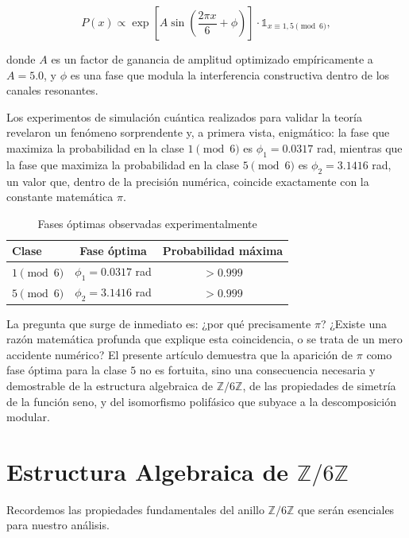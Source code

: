 \documentclass[12pt,a4paper]{article}
\theoremstyle{plain}
\theoremstyle{definition}
\theoremstyle{remark}
\begin{document}
\begin{equation}
P(x) \propto \exp\left[A \sin\left(\frac{2\pi x}{6} + \phi\right)\right] \cdot \mathbb{1}_{x\equiv 1,5 \pmod{6}},
\label{eq:amplitud}
\end{equation}

donde $A$ es un factor de ganancia de amplitud optimizado empíricamente a $A = 5.0$, y $\phi$ es una fase que modula la interferencia constructiva dentro de los canales resonantes.

Los experimentos de simulación cuántica realizados para validar la teoría revelaron un fenómeno sorprendente y, a primera vista, enigmático: la fase que maximiza la probabilidad en la clase $1 \pmod 6$ es $\phi_1 = 0.0317$ rad, mientras que la fase que maximiza la probabilidad en la clase $5 \pmod 6$ es $\phi_2 = 3.1416$ rad, un valor que, dentro de la precisión numérica, coincide exactamente con la constante matemática $\pi$.

\begin{table}[h]
\centering
\caption{Fases óptimas observadas experimentalmente}
\label{tab:fases}
\begin{tabular}{lcc}
\toprule
\textbf{Clase} & \textbf{Fase óptima} & \textbf{Probabilidad máxima} \\
\midrule
$1 \pmod 6$ & $\phi_1 = 0.0317$ rad & $> 0.999$ \\
$5 \pmod 6$ & $\phi_2 = 3.1416$ rad & $> 0.999$ \\
\bottomrule
\end{tabular}
\end{table}

La pregunta que surge de inmediato es: ¿por qué precisamente $\pi$? ¿Existe una razón matemática profunda que explique esta coincidencia, o se trata de un mero accidente numérico? El presente artículo demuestra que la aparición de $\pi$ como fase óptima para la clase $5$ no es fortuita, sino una consecuencia necesaria y demostrable de la estructura algebraica de $\mathbb{Z}/6\mathbb{Z}$, de las propiedades de simetría de la función seno, y del isomorfismo polifásico que subyace a la descomposición modular.

\section{Estructura Algebraica de $\mathbb{Z}/6\mathbb{Z}$}

Recordemos las propiedades fundamentales del anillo $\mathbb{Z}/6\mathbb{Z}$ que serán esenciales para nuestro análisis.
\end{document}
